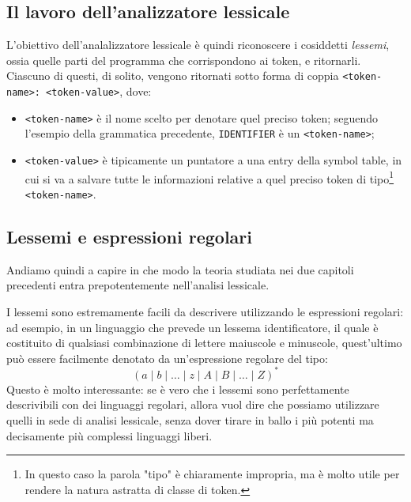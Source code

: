 \documentclass[class=book, crop=false, oneside, 12pt]{standalone}
\begin{document}
\subsection{Il lavoro dell'analizzatore lessicale}
L'obiettivo dell'analalizzatore lessicale è quindi riconoscere i cosiddetti \emph{lessemi}, ossia quelle parti del programma che corrispondono ai token, e ritornarli. Ciascuno di questi, di solito, vengono ritornati sotto forma di coppia \texttt{<token-name>: <token-value>}, dove:
\begin{itemize}
    \item \texttt{<token-name>} è il nome scelto per denotare quel preciso token; seguendo l'esempio della grammatica precedente, \texttt{IDENTIFIER} è un \texttt{<token-name>};
    \item \texttt{<token-value>} è tipicamente un puntatore a una entry della symbol table, in cui si va a salvare tutte le informazioni relative a quel preciso token di tipo\footnote{In questo caso la parola "tipo" è chiaramente impropria, ma è molto utile per rendere la natura astratta di classe di token.} \texttt{<token-name>}.
\end{itemize}

\subsection{Lessemi e espressioni regolari}
Andiamo quindi a capire in che modo la teoria studiata nei due capitoli precedenti entra prepotentemente nell'analisi lessicale.

I lessemi sono estremamente facili da descrivere utilizzando le espressioni regolari: ad esempio, in un linguaggio che prevede un lessema identificatore, il quale è costituito di qualsiasi combinazione di lettere maiuscole e minuscole, quest'ultimo può essere facilmente denotato da un'espressione regolare del tipo:
\begin{equation*}
    (a \mid b \mid \ldots \mid z \mid A \mid B \mid \ldots \mid Z)^*
\end{equation*}
Questo è molto interessante: se è vero che i lessemi sono perfettamente descrivibili con dei linguaggi regolari, allora vuol dire che possiamo utilizzare quelli in sede di analisi lessicale, senza dover tirare in ballo i più potenti ma decisamente più complessi linguaggi liberi.
\end{document}
